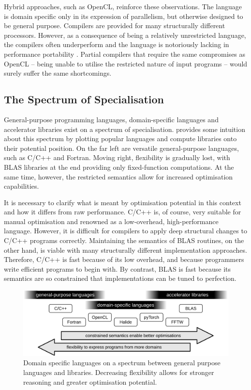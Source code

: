    Hybrid approaches, such as OpenCL, reinforce these observations.
    The language is domain specific only in its expression of parallelism, but
    otherwise designed to be general purpose.
    Compilers are provided for many structurally different processors.
    However, as a consequence of being a relatively unrestricted language, the
    compilers often underperform and the language is notoriously lacking in
    performance portability \citep{Falch:2015:MLB:2863697.2864570}.
    Partial compilers that require the same compromises as OpenCL -- being
    unable to utilise the restricted nature of input programs -- would surely
    suffer the same shortcomings.

\subsection{The Spectrum of Specialisation}

    General-purpose programming languages, domain-specific languages and
    accelerator libraries exist on a spectrum of specialisation.
     provides some intuition about this spectrum by
    plotting popular languages and compute libraries onto their
    potential position.
    On the far left are versatile general-purpose languages, such as
    C/C++ and Fortran.
    Moving right, flexibility is gradually lost, with BLAS libraries at
    the end providing only fixed-function computations.
    At the same time, however, the restricted semantics allow for increased 
    optimisation capabilities.

    It is necessary to clarify what is meant by optimisation potential in this
    context and how it differs from raw performance.
    C/C++ is, of course, very suitable for manual optimisation and renowned as a
    low-overhead, high-performance language.
    However, it is difficult for compilers to apply deep structural changes to
    C/C++ programs correctly.
    Maintaining the semantics of BLAS routines, on the other hand, is viable
    with many structurally different implementation approaches.
    Therefore, C/C++ is fast because of its low overhead, and because
    programmers write efficient programs to begin with.
    By contrast, BLAS is fast because its semantics are so constrained that
    implementations can be tuned to perfection.

\begin{figure}[t]
\centering
\includegraphics[width=\textwidth]{figures/DSLgradient}
\caption{Domain specific languages on a spectrum between general purpose
         languages and libraries.
         Decreasing flexibility allows for stronger reasoning and greater
         optimisation potential.}
\label{specialgradient}
\end{figure}

